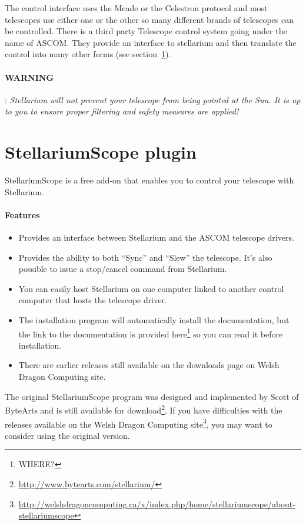 The control interface uses the Meade or the Celestron protocol and
most telescopes use either one or the other so many different brands
of telescopes can be controlled. There is a third party Telescope
control system going under the name of ASCOM. They provide an
interface to stellarium and then translate the control into many other
forms (see section~\ref{sec:plugins:StellariumScope}).


\paragraph{WARNING}: \emph{Stellarium will not prevent your telescope from being pointed at the Sun. It is up to you to ensure proper filtering and safety measures are applied!}

\section{StellariumScope plugin}
\label{sec:plugins:StellariumScope}
StellariumScope is a free add-on that enables you to control your telescope with Stellarium. 

\paragraph{Features}
\begin{itemize}
\item Provides an interface between Stellarium and the ASCOM telescope drivers.
\item Provides the ability to both ``Sync'' and ``Slew'' the
  telescope. It's also possible to issue a stop/cancel command from
  Stellarium.
\item You can easily host Stellarium on one computer linked to another
  control computer that hosts the telescope driver.
\item The installation program will automatically install the
  documentation, but the link to the documentation is provided
  here\footnote{WHERE?} so you can read it before installation.
\item There are earlier releases still available on the downloads page on
  Welsh Dragon Computing site.
\end{itemize}

The original StellariumScope program was designed and implemented by
Scott of ByteArts and is still available for
download\footnote{\url{http://www.bytearts.com/stellarium/}}. If you
have difficulties with the releases available on the Welsh Dragon
Computing
site\footnote{\url{http://welshdragoncomputing.ca/x/index.php/home/stellariumscope/about-stellariumscope}},
you may want to consider using the original version.

